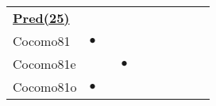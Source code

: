 \begin{figure*}[!t]
\begin{tabular}{lccccccccc|}
%
\hline\multicolumn{10}{l}{  \underline{{\bf Pred(25)}}}	\\
Cocomo81	&	$\bullet$	&		&		&		&		&		&		&		&		\\
Cocomo81e	&		&		&	$\bullet$	&		&		&		&		&		&		\\
Cocomo81o	&	$\bullet$	&		&		&		&		&		&		&		&		\\

\end{tabular}
\end{figure*}
